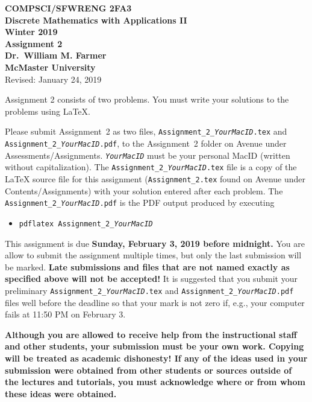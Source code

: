 \documentclass[11pt,fleqn]{article}
\begin{document}
\begin{center}

  {\large \textbf{COMPSCI/SFWRENG 2FA3}}\\[2mm]
  {\large \textbf{Discrete Mathematics with Applications II}}\\[2mm]
  {\large \textbf{Winter 2019}}\\[8mm]
  {\huge \textbf{Assignment 2}}\\[6mm]
  {\large \textbf{Dr.~William M. Farmer}}\\[2mm]
  {\large \textbf{McMaster University}}\\[6mm]
  {\large Revised: January 24, 2019}

\end{center}

\medskip

Assignment 2 consists of two problems.  You must write your solutions
to the problems using LaTeX.

Please submit Assignment~2 as two files,
\texttt{Assignment\_2\_\emph{YourMacID}.tex} and
\texttt{Assignment\_2\_\emph{YourMacID}.pdf}, to the Assignment~2
folder on Avenue under Assessments/Assignments.
\texttt{\emph{YourMacID}} must be your personal MacID (written without
capitalization).  The \texttt{Assignment\_2\_\emph{YourMacID}.tex}
file is a copy of the LaTeX source file for this assignment
(\texttt{Assignment\_2.tex} found on Avenue under
Contents/Assignments) with your solution entered after each problem.
The \texttt{Assignment\_2\_\emph{YourMacID}.pdf} is the PDF output
produced by executing

\begin{itemize}

  \item[] \texttt{pdflatex Assignment\_2\_\emph{YourMacID}}

\end{itemize}

This assignment is due \textbf{Sunday, February 3, 2019 before
  midnight.}  You are allow to submit the assignment multiple times,
but only the last submission will be marked.  \textbf{Late submissions
  and files that are not named exactly as specified above will not be
  accepted!}  It is suggested that you submit your preliminary
\texttt{Assignment\_2\_\emph{YourMacID}.tex} and
\texttt{Assignment\_2\_\emph{YourMacID}.pdf} files well before the
deadline so that your mark is not zero if, e.g., your computer fails
at 11:50 PM on February 3.

\textbf{Although you are allowed to receive help from the
  instructional staff and other students, your submission must be your
  own work.  Copying will be treated as academic dishonesty! If any of
  the ideas used in your submission were obtained from other students
  or sources outside of the lectures and tutorials, you must
  acknowledge where or from whom these ideas were obtained.}
\end{document}
